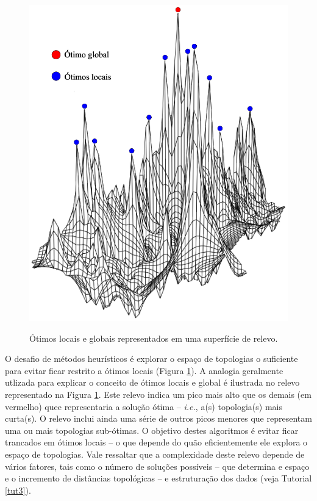 \begin{refsection}
  \begin{figure}[H]
       \centering
      {\includegraphics[scale=0.70]{figures/tut4/landscape.eps}}
      {\caption[\textit{\textit{Ótimos locais e globais} }]{Ótimos locais e globais representados em uma superfície de relevo.}\label{tut4:fig:landscape}}
  \end{figure}




O desafio de métodos heurísticos é explorar o espaço de topologias o suficiente para evitar ficar restrito a ótimos locais (Figura \ref{tut4:fig:landscape}). A analogia geralmente utlizada para explicar o conceito de ótimos locais e global é ilustrada no relevo representado na Figura \ref{tut4:fig:landscape}. Este relevo indica um pico mais alto que os demais (em vermelho) quee representaria a solução ótima -- \textit{i.e.}, a(s) topologia(s) mais curta(s). O relevo inclui ainda uma série de outros picos menores que representam uma ou mais topologias sub-ótimas. O objetivo destes algoritmos é evitar ficar trancados em ótimos locais -- o que depende do quão eficientemente ele explora o espaço de topologias. Vale ressaltar que a complexidade deste relevo depende de vários fatores, tais como o número de soluções possíveis -- que determina e espaço e o incremento de distâncias topológicas -- e estruturação dos dados (veja Tutorial \ref{tut3}).


\end{refsection}
